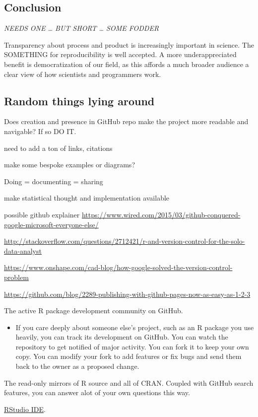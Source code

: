 \documentclass[12pt]{article}
\providecommand{\tightlist}{%
  \setlength{\itemsep}{0pt}\setlength{\parskip}{0pt}}
\begin{document}
\subsection{Conclusion}\label{conclusion}

\emph{NEEDS ONE \ldots{} BUT SHORT \ldots{} SOME FODDER}

Transparency about \citep{greenwade93} process and product is
increasingly important in science. The SOMETHING for reproducibility is
well accepted. A more underappreciated benefit is democratization of our
field, as this affords a much broader audience a clear view of how
scientists and programmers work.

\subsection{Random things lying
around}\label{random-things-lying-around}

Does creation and presence in GitHub repo make the project more readable
and navigable? If so DO IT.

need to add a ton of links, citations

make some bespoke examples or diagrams?

Doing = documenting = sharing

make statistical thought and implementation available

possible github explainer
\url{https://www.wired.com/2015/03/github-conquered-google-microsoft-everyone-else/}

\url{http://stackoverflow.com/questions/2712421/r-and-version-control-for-the-solo-data-analyst}

\url{https://www.onshape.com/cad-blog/how-google-solved-the-version-control-problem}

\url{https://github.com/blog/2289-publishing-with-github-pages-now-as-easy-as-1-2-3}

The active R package development community on GitHub.

\begin{itemize}
\tightlist
\item
  If you care deeply about someone else's project, such as an R package
  you use heavily, you can track its development on GitHub. You can
  watch the repository to get notified of major activity. You can fork
  it to keep your own copy. You can modify your fork to add features or
  fix bugs and send them back to the owner as a proposed change.
\end{itemize}

The read-only mirrors of R source and all of CRAN. Coupled with GitHub
search features, you can answer alot of your own questions this way.

\href{https://www.rstudio.com/products/rstudio-desktop/}{RStudio IDE}.



\end{document}

